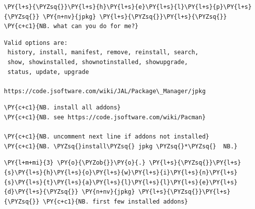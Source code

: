     \begin{tcolorbox}[breakable, size=fbox, boxrule=1pt, pad at break*=1mm,colback=cellbackground, colframe=cellborder]
\begin{Verbatim}[commandchars=\\\{\}]
\PY{l+s}{\PYZsq{}}\PY{l+s}{h}\PY{l+s}{e}\PY{l+s}{l}\PY{l+s}{p}\PY{l+s}{\PYZsq{}} \PY{n+nv}{jpkg} \PY{l+s}{\PYZsq{}}\PY{l+s}{\PYZsq{}}   \PY{c+c1}{NB. what can you do for me?}
\end{Verbatim}
\end{tcolorbox}

    \begin{Verbatim}[commandchars=\\\{\}]
Valid options are:
 history, install, manifest, remove, reinstall, search,
 show, showinstalled, shownotinstalled, showupgrade,
 status, update, upgrade

https://code.jsoftware.com/wiki/JAL/Package\_Manager/jpkg

    \end{Verbatim}

    \begin{tcolorbox}[breakable, size=fbox, boxrule=1pt, pad at break*=1mm,colback=cellbackground, colframe=cellborder]
\begin{Verbatim}[commandchars=\\\{\}]
\PY{c+c1}{NB. install all addons}
\PY{c+c1}{NB. see https://code.jsoftware.com/wiki/Pacman}

\PY{c+c1}{NB. uncomment next line if addons not installed}
\PY{c+c1}{NB. \PYZsq{}install\PYZsq{} jpkg \PYZsq{}*\PYZsq{}  NB.}
\end{Verbatim}
\end{tcolorbox}

    \begin{tcolorbox}[breakable, size=fbox, boxrule=1pt, pad at break*=1mm,colback=cellbackground, colframe=cellborder]
\begin{Verbatim}[commandchars=\\\{\}]
\PY{l+m+mi}{3} \PY{o}{\PYZob{}}\PY{o}{.} \PY{l+s}{\PYZsq{}}\PY{l+s}{s}\PY{l+s}{h}\PY{l+s}{o}\PY{l+s}{w}\PY{l+s}{i}\PY{l+s}{n}\PY{l+s}{s}\PY{l+s}{t}\PY{l+s}{a}\PY{l+s}{l}\PY{l+s}{l}\PY{l+s}{e}\PY{l+s}{d}\PY{l+s}{\PYZsq{}} \PY{n+nv}{jpkg} \PY{l+s}{\PYZsq{}}\PY{l+s}{\PYZsq{}} \PY{c+c1}{NB. first few installed addons}
\end{Verbatim}
\end{tcolorbox}

